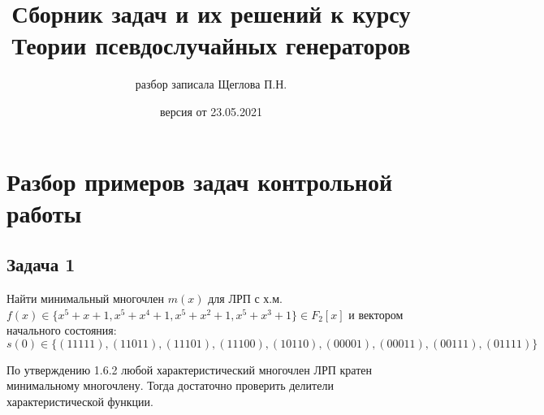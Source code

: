 \documentclass[12pt]{extarticle}
\title{Сборник задач и их решений к курсу Теории псевдослучайных генераторов}
\date{версия от 23.05.2021}
\author{разбор записала Щеглова П.Н.}
\begin{document}
\maketitle


\section{Разбор примеров задач контрольной работы}
\subsection{Задача 1}
Найти минимальный многочлен $m(x)$ для ЛРП с х.м. $f(x)\in\{x^5+x+1, x^5+x^4+1, x^5+x^2+1, x^5+x^3+1\}\in F_2[x]$ и вектором начального состояния: $$s(0)\in\{(11111), (11011), (11101), (11100), (10110), (00001), (00011), (00111), (01111)\}$$

По утверждению 1.6.2 любой характеристический многочлен ЛРП кратен минимальному многочлену. Тогда достаточно проверить делители характеристической функции.
\end{document}
